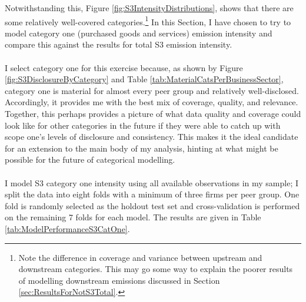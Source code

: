\documentclass[12pt,twoside]{report}
\begin{document}
 Notwithstanding this, Figure \ref{fig:S3IntensityDistributions}, shows that there are some relatively well-covered categories.\footnote{Note the difference in coverage and variance between upstream and downstream categories. This may go some way to explain the poorer results of modelling downstream emissions discussed in Section \ref{sec:ResultsForNotS3Total}.} In this Section, I have chosen to try to model category one (purchased goods and services) emission intensity and compare this against the results for total S3 emission intensity. 
 \\\\
 I select category one for this exercise because, as shown by Figure \ref{fig:S3DisclosureByCategory} and Table \ref{tab:MaterialCatsPerBusinessSector}, category one is material for almost every peer group and relatively well-disclosed. Accordingly, it provides me with the best mix of coverage, quality, and relevance. Together, this perhaps provides a picture of what data quality and coverage could look like for other categories in the future if they were able to catch up with scope one's levels of disclosure and consistency. This makes it the ideal candidate for an extension to the main body of my analysis, hinting at what might be possible for the future of categorical modelling. 
\\\\
I model S3 category one intensity using all available observations in my sample; I split the data into eight folds with a minimum of three firms per peer group. One fold is randomly selected as the holdout test set and cross-validation is performed on the remaining 7 folds for each model. The results are given in Table \ref{tab:ModelPerformanceS3CatOne}.\\
\end{document}
